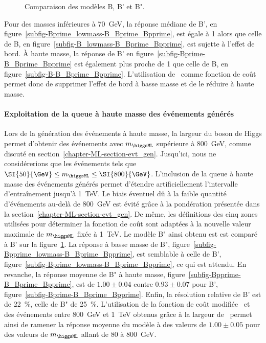 \begin{figure}[p]
\caption{Comparaison des modèles B, B' et B".}
\label{fig-B_Bprime_Bpprime-boundaries_effect}
\end{figure}
Pour des masses inférieures à \SI{70}{\GeV},
la réponse médiane de B', en figure~\ref{subfig-Bprime_lowmass-B_Bprime_Bpprime},
est égale à 1 alors que celle de B, en figure~\ref{subfig-B_lowmass-B_Bprime_Bpprime},
est sujette à l'effet de bord.
À haute masse,
la réponse de B' en figure~\ref{subfig-Bprime-B_Bprime_Bpprime} est également plus proche de 1
que celle de B, en figure~\ref{subfig-B-B_Bprime_Bpprime}.
L'utilisation de  \LossMAPEsqrt\ comme fonction de coût permet donc de
supprimer l'effet de bord à basse masse
et de le réduire à haute masse.
\paragraph{Exploitation de la queue à haute masse des événements générés}
Lors de la génération des événements à haute masse, la largeur du boson de Higgs permet d'obtenir des événements avec $m_{\higgsML}$ supérieure à \SI{800}{\GeV}, comme discuté en section~\ref{chapter-ML-section-evt_gen}.
Jusqu'ici, nous ne considérerions que les événements tels que
$\SI{50}{\GeV}\leq m_{\higgsML}\leq \SI{800}{\GeV}$.
L'inclusion de la queue à haute masse des événements générés permet d'étendre artificiellement l'intervalle d'entraînement jusqu'à \SI{1}{\TeV}.
Le biais éventuel dû à la faible quantité d'événements au-delà de \SI{800}{\GeV} est évité grâce à la pondération présentée dans la section~\ref{chapter-ML-section-evt_gen}.
De même, les définitions des cinq zones utilisées pour déterminer la fonction de coût sont adaptées à la nouvelle valeur maximale de $m_{\higgsML}$ fixée à \SI{1}{\TeV}.
Le modèle B" ainsi obtenu est est comparé à B'
sur la figure~\ref{fig-B_Bprime_Bpprime-boundaries_effect}.
La réponse à basse masse de B", figure~\ref{subfig-Bpprime_lowmass-B_Bprime_Bpprime},
est semblable à celle de B', figure~\ref{subfig-Bprime_lowmass-B_Bprime_Bpprime},
ce qui est attendu.
En revanche, la réponse moyenne de B" à haute masse, figure~\ref{subfig-Bpprime-B_Bprime_Bpprime},
est de $\num{1.00}\pm\num{0.04}$
contre $\num{0.93}\pm\num{0.07}$ pour B', figure~\ref{subfig-Bprime-B_Bprime_Bpprime}.
Enfin, la résolution relative de B' est de \SI{22}{\%}, celle de B" de \SI{25}{\%}.
L'utilisation de la fonction de coût modifiée \LossMAPEsqrtb\
et des événements entre \SI{800}{\GeV} et \SI{1}{\TeV} obtenus grâce à la largeur de \higgsML\
permet ainsi de ramener la réponse moyenne du modèle à des valeurs de $\num{1.00}\pm\num{0.05}$
pour des valeurs de $m_{\higgsML}$ allant de \num{80} à \SI{800}{\GeV}.
